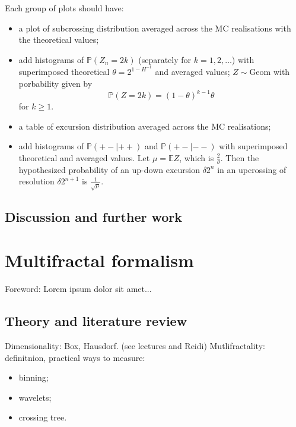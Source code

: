 \documentclass[a4paper]{report}
\newcommand{\pr}{\mathbb{P}}
\newcommand{\ex}{\mathbb{E}}
\begin{document}
Each group of plots should have: \begin{itemize}
	\item a plot of subcrossing distribution averaged across the MC realisations with
	the theoretical values;
	\item add histograms of $\pr(Z_n = 2k)$ (separately for $k=1,2,\ldots$) with
	superimposed theoretical $\theta = 2^{1-H^{-1}}$ and averaged values;
	$Z\sim\text{Geom}$ with porbability given by
	\[\pr(Z = 2k) = (1-\theta)^{k-1} \theta\]
	for $k\geq 1$.
	\item a table of excursion distribution averaged across the MC realisations;
	\item add histograms of $\pr(+-|++)$ and $\pr(+-|--)$ with superimposed theoretical
	and averaged values. Let $\mu = \ex Z$, which is $\frac{2}{\theta}$. Then the
	hypothesized probability of an up-down excursion $\delta 2^n$ in an upcrossing
	of resolution $\delta 2^{n+1}$ is $\frac{1}{\sqrt{\mu}}$.
\end{itemize}


\section{Discussion and further work} %
\label{sec:discussion_and_further_work}




\chapter{Multifractal formalism} %
\label{cha:multifractal_formalism}

Foreword: Lorem ipsum dolor sit amet...

\section{Theory and literature review} %
\label{sec:theory_and_literature_review}

Dimensionality: Box, Hausdorf. (see lectures and Reidi)
Mutlifractality: definitnion, practical ways to measure:
\begin{itemize}
	\item binning;
	\item wavelets;
	\item crossing tree.
\end{itemize}
\end{document}
